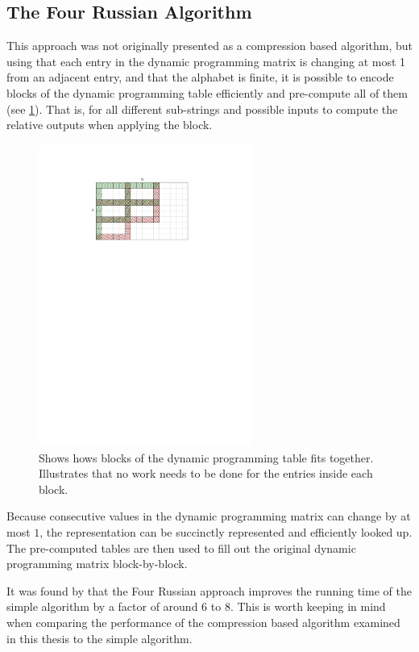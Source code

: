 \documentclass[twoside,11pt,openright]{report}
\begin{document}
\subsection{The Four Russian Algorithm}
\label{sec:4-russian}
This approach was not originally presented as a compression based algorithm, but using that each entry in the dynamic programming matrix is changing at most 1 from an adjacent entry, and that the alphabet is finite, it is possible to encode blocks of the dynamic programming table efficiently and pre-compute all of them (see \cref{fig:intro:dist-tables}). That is, for all different sub-strings and possible inputs to compute the relative outputs when applying the block. 

\begin{figure}[!htb]
  \centering
  \includegraphics[width=7cm]{images/grid-dist-2}
  \caption{Shows hows blocks of the dynamic programming table fits together. Illustrates that no work needs to be done for the entries inside each block.}
  \label{fig:intro:dist-tables}
\end{figure}

Because consecutive values in the dynamic programming matrix can change by at most $1$, the representation can be succinctly represented and efficiently looked up. The pre-computed tables are then used to fill out the original dynamic programming matrix block-by-block.

It was found by \cite{LasseFourRussian} that the Four Russian approach improves the running time of the simple algorithm by a factor of around $6$ to $8$. This is worth keeping in mind when comparing the performance of the compression based algorithm examined in this thesis to the simple algorithm.
\end{document}
